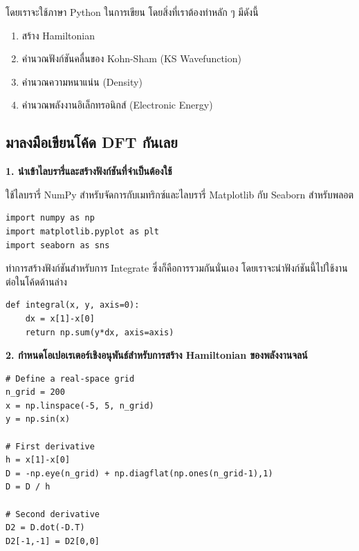 โดยเราจะใช้ภาษา Python ในการเขียน โดยสิ่งที่เราต้องทำหลัก ๆ มีดังนี้
%
\begin{enumerate}[topsep=0pt,noitemsep]
  \setlength\itemsep{0.5em}
  \item สร้าง Hamiltonian

  \item คำนวณฟังก์ชันคลื่นของ Kohn-Sham (KS Wavefunction)

  \item คำนวณความหนาแน่น (Density)

  \item คำนวณพลังงานอิเล็กทรอนิกส์ (Electronic Energy)
\end{enumerate}

\subsection{มาลงมือเขียนโค้ด DFT กันเลย}

\noindent \textbf{1. นำเข้าไลบรารี่และสร้างฟังก์ชันที่จำเป็นต้องใช้}

ใช้ไลบรารี่ NumPy สำหรับจัดการกับเมทริกซ์และไลบรารี่ Matplotlib กับ Seaborn สำหรับพลอต
\begin{lstlisting}[style=MyPython]
import numpy as np
import matplotlib.pyplot as plt
import seaborn as sns
\end{lstlisting}

\vspace{5pt}

ทำการสร้างฟังก์ชันสำหรับการ Integrate ซึ่งก็คือการรวมกันนั่นเอง โดยเราจะนำฟังก์ชันนี้ไปใช้งานต่อในโค้ดด้านล่าง

\vspace{5pt}

\begin{lstlisting}[style=MyPython]
def integral(x, y, axis=0):
    dx = x[1]-x[0]
    return np.sum(y*dx, axis=axis)
\end{lstlisting}

\vspace{5pt}

\noindent \textbf{2. กำหนดโอเปอเรเตอร์เชิงอนุพันธ์สำหรับการสร้าง Hamiltonian ของพลังงานจลน์}

\begin{lstlisting}[style=MyPython]
# Define a real-space grid
n_grid = 200
x = np.linspace(-5, 5, n_grid)
y = np.sin(x)

# First derivative
h = x[1]-x[0]
D = -np.eye(n_grid) + np.diagflat(np.ones(n_grid-1),1)
D = D / h

# Second derivative
D2 = D.dot(-D.T)
D2[-1,-1] = D2[0,0]
\end{lstlisting}

